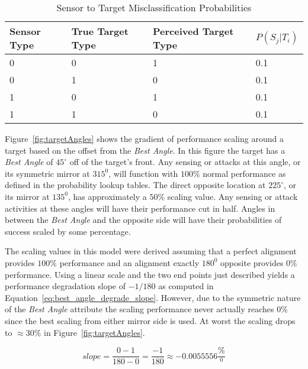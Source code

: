 \begin{table}[H]
	\caption{Sensor to Target Misclassification Probabilities}
	\centering
	\label{tab:snsrTgtMisClassProb}
	\begin{tabular}{|p{1cm}|p{1.25cm}|p{1.6cm}|p{1.5cm}|}
		\hline
		Sensor Type & True Target Type & Perceived Target Type & $P(S_{j}|T_{i})$\\ \hline
		0 & 0 & 1 & 0.1 \\ \hline
		0 & 1 & 0 & 0.1 \\ \hline
		1 & 0 & 1 & 0.1 \\ \hline
		1 & 1 & 0 & 0.1 \\ \hline
	\end{tabular}
\end{table}

Figure~\ref{fig:targetAngles} shows the gradient of performance scaling around a target based on the offset from the \textit{Best Angle}.  In this figure the target has a \textit{Best Angle} of $45^{\circ}$ off of the target's front.  Any sensing or attacks at this angle, or its symmetric mirror at $315^{0}$, will function with $100\%$ normal performance as defined in the probability lookup tables.  The direct opposite location at $225^{\circ}$, or its mirror at $135^{0}$, has approximately a $50\%$ scaling value.  Any sensing or attack activities at these angles will have their performance cut in half.  Angles in between the \textit{Best Angle} and the opposite side will have their probabilities of success scaled by some percentage.

The scaling values in this model were derived assuming that a perfect alignment provides $100\%$ performance and an alignment exactly $180^{0}$ opposite provides $0\%$ performance.  Using a linear scale and the two end points just described yields a performance degradation slope of $-1 / 180$ as computed in Equation~\ref{eq:best_angle_degrade_slope}. However, due to the symmetric nature of the \textit{Best Angle} attribute the scaling performance never actually reaches $0\%$ since the best scaling from either mirror side is used.  At worst the scaling drops to $\approx30\%$ in Figure~\ref{fig:targetAngles}. 

\begin{equation}
\label{eq:best_angle_degrade_slope}
slope = \frac{0 - 1}{180-0} = \frac{-1}{180} \approx -0.0055556\frac{\%}{^{0}}
\end{equation}


